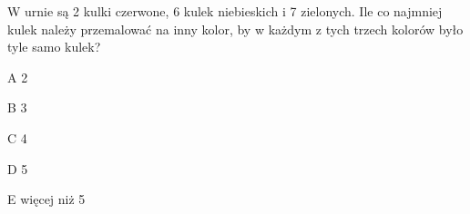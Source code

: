 \begin{tresc}
W urnie są 2 kulki czerwone, 6 kulek niebieskich i 7 zielonych. Ile co najmniej kulek należy przemalować na inny kolor, by w każdym z tych trzech kolorów było tyle samo kulek?
\end{tresc}
\begin{wariant}{A} 2 \end{wariant}
\begin{wariant}{B} 3 \end{wariant}
\begin{wariant}{C} 4 \end{wariant}
\begin{wariant}{D} 5 \end{wariant}
\begin{wariant}{E} więcej niż 5 \end{wariant}
